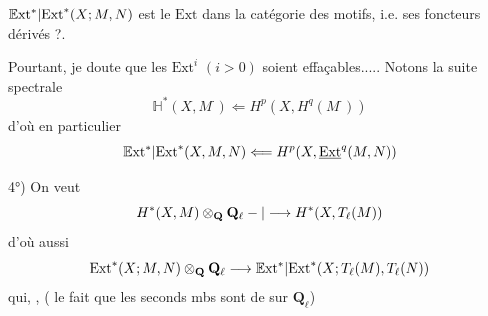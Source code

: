 $\mathbb{E}\mathrm{xt}^*|\mathrm{Ext}^*(X;M,N)$ est le  $\mathrm{Ext}$ dans la catégorie des motifs, i.e. ses foncteurs dérivés ?.

Pourtant, je doute que les $\mathrm{Ext}^i$ $(i>0)$ soient effaçables.....
Notons la suite spectrale
\[
\mathbb{H}^*(X,M^\cdot)\Longleftarrow H^p(X,H^q(M^\cdot))
\]
d'où en particulier
\[
\mathbb{E}\mathrm{xt}^*|\mathrm{Ext}^*(X,M,N)\Longleftarrow H^p(X,\underline{\mathrm{Ext}}^q(M,N))
\]

4°) On veut  
\[
H^*(X,M)\otimes_{\mathbf{Q}}\mathbf{Q}_\ell-|\longrightarrow H^*(X,T_\ell(M))
\]
d'où aussi
\[
\mathrm{Ext}^*(X;M,N)\otimes_{\mathbf{Q}}\mathbf{Q}_\ell\longrightarrow \mathbb{E}\mathrm{xt}^*|\mathrm{Ext}^*(X;T_\ell(M),T_\ell(N))
\]
qui,  ,  ( le fait que les seconds mbs sont de  sur $\mathbf{Q}_\ell$)
